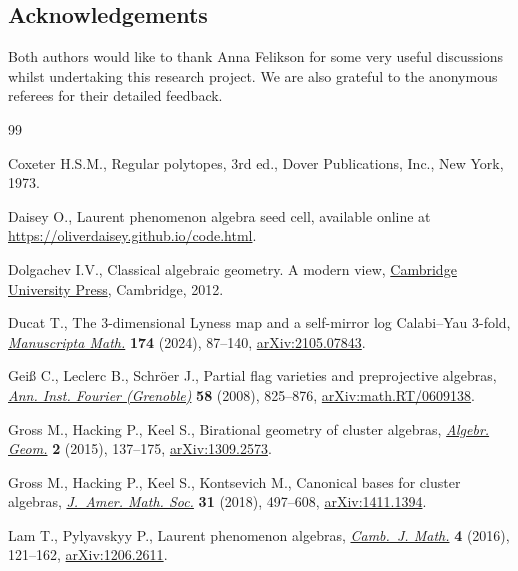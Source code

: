 \documentclass[10pt,a4paper]{amsart}
\numberwithin{equation}{section}
\theoremstyle{definition}
\begin{document}
\subsection*{Acknowledgements}

Both authors would like to thank Anna Felikson for some very useful discussions whilst undertaking this research project. We are also grateful to the anonymous referees for their detailed feedback.


\begin{thebibliography}{99}
\footnotesize\itemsep=0pt

Coxeter H.S.M., Regular polytopes, 3rd ed., Dover Publications, Inc., New York,
 1973.

Daisey O., Laurent phenomenon algebra seed cell, available online at
 \url{https://oliverdaisey.github.io/code.html}.

Dolgachev I.V., Classical algebraic geometry. {A} modern view, \href{https://doi.org/10.1017/CBO9781139084437}{Cambridge
 University Press}, Cambridge, 2012.

Ducat T., The 3-dimensional {L}yness map and a self-mirror log {C}alabi--{Y}au
 3-fold, \href{https://doi.org/10.1007/s00229-023-01497-0}{\textit{Manuscripta Math.}} \textbf{174} (2024), 87--140,
 \href{https://arxiv.org/abs/2105.07843}{arXiv:2105.07843}.

Gei{\ss} C., Leclerc B., Schr\"oer J., Partial flag varieties and preprojective
 algebras, \href{https://doi.org/10.5802/aif.2371}{\textit{Ann. Inst. Fourier (Grenoble)}} \textbf{58} (2008),
 825--876, \href{https://arxiv.org/abs/math.RT/0609138}{arXiv:math.RT/0609138}.

Gross M., Hacking P., Keel S., Birational geometry of cluster algebras,
 \href{https://doi.org/10.14231/AG-2015-007}{\textit{Algebr. Geom.}} \textbf{2} (2015), 137--175, \href{https://arxiv.org/abs/1309.2573}{arXiv:1309.2573}.

Gross M., Hacking P., Keel S., Kontsevich M., Canonical bases for cluster
 algebras, \href{https://doi.org/10.1090/jams/890}{\textit{J.~Amer. Math. Soc.}} \textbf{31} (2018), 497--608,
 \href{https://arxiv.org/abs/1411.1394}{arXiv:1411.1394}.

Lam T., Pylyavskyy P., Laurent phenomenon algebras, \href{https://doi.org/10.4310/CJM.2016.v4.n1.a2}{\textit{Camb.~J. Math.}}
 \textbf{4} (2016), 121--162, \href{https://arxiv.org/abs/1206.2611}{arXiv:1206.2611}.


\end{thebibliography}
\end{document}
